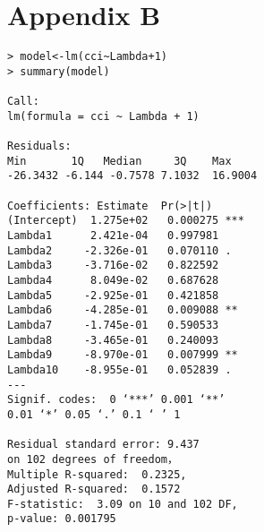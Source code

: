 \documentclass[10pt,journal,compsoc]{IEEEtran}
\begin{document}
\section*{Appendix B}
\begin{lstlisting}
> model<-lm(cci~Lambda+1)
> summary(model)

Call:
lm(formula = cci ~ Lambda + 1)

Residuals:
Min       1Q   Median     3Q    Max 
-26.3432 -6.144 -0.7578 7.1032  16.9004 

Coefficients: Estimate  Pr(>|t|)    
(Intercept)  1.275e+02   0.000275 ***
Lambda1      2.421e-04   0.997981    
Lambda2     -2.326e-01   0.070110 .  
Lambda3     -3.716e-02   0.822592    
Lambda4      8.049e-02   0.687628    
Lambda5     -2.925e-01   0.421858    
Lambda6     -4.285e-01   0.009088 ** 
Lambda7     -1.745e-01   0.590533    
Lambda8     -3.465e-01   0.240093    
Lambda9     -8.970e-01   0.007999 ** 
Lambda10    -8.955e-01   0.052839 .  
---
Signif. codes:  0 ‘***’ 0.001 ‘**’ 
0.01 ‘*’ 0.05 ‘.’ 0.1 ‘ ’ 1

Residual standard error: 9.437 
on 102 degrees of freedom，
Multiple R-squared:  0.2325,
Adjusted R-squared:  0.1572 
F-statistic:  3.09 on 10 and 102 DF,  
p-value: 0.001795
\end{lstlisting}


%
%
%





% 
\end{document}
